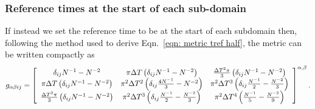 \documentclass[../full_thesis/full_thesis.tex]{subfiles}
\begin{document}
\subsubsection{Reference times at the start of each sub-domain}
If instead we set the reference time to be at the start of each subdomain then,
following the method used to derive Eqn.~\eqref{eqn: metric tref half}, the
metric can be written compactly as
\begin{equation}
g_{\alpha\beta ij}  =  \left[\begin{array}{ccc}
\delta_{ij}N^{-1}  -N^{-2}  &
\pi\Delta T \left( \delta_{ij}N^{-1} - N^{-2}\right)&
\frac{\Delta T^{2}\pi}{3} \left( \delta_{ij}N^{-1} - N^{-2}\right)\\
\pi\Delta T \left( \delta_{ij}N^{-1} - N^{-2}\right)&
\pi^{2}\Delta T^{2}\left(\delta_{ij}\frac{4N^{-1}}{3} - N^{-2}\right) &
\pi^{2}\Delta T^{3}\left(\delta_{ij}\frac{N^{-1}}{2} - \frac{N^{-2}}{3}\right) \\
\frac{\Delta T^{2}\pi}{3} \left( \delta_{ij}N^{-1} - N^{-2}\right) &
\pi^{2}\Delta T^{3}\left(\delta_{ij}\frac{N^{-1}}{2} - \frac{N^{-2}}{3}\right)  &
\pi^{2}\Delta T^{4}\left(\frac{N^{-1}}{5} - \frac{N^{-2}}{9}\right) \\
\end{array}
\right]^{\alpha, \beta}.
\label{eqn: metric equal subdomains tref 0}
\end{equation}



\biblio
\end{document}

